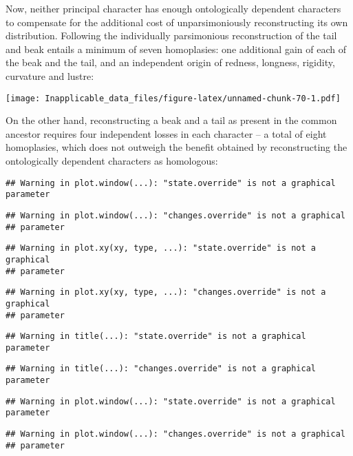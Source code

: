 \documentclass[]{book}
\theoremstyle{definition}
\theoremstyle{definition}
\theoremstyle{definition}
\theoremstyle{remark}
\begin{document}
Now, neither principal character has enough ontologically dependent
characters to compensate for the additional cost of unparsimoniously
reconstructing its own distribution. Following the individually
parsimonious reconstruction of the tail and beak entails a minimum of
seven homoplasies: one additional gain of each of the beak and the tail,
and an independent origin of redness, longness, rigidity, curvature and
lustre:

\texttt{[image: Inapplicable\_data\_files/figure-latex/unnamed-chunk-70-1.pdf]}

On the other hand, reconstructing a beak and a tail as present in the
common ancestor requires four independent losses in each character -- a
total of eight homoplasies, which does not outweigh the benefit obtained
by reconstructing the ontologically dependent characters as homologous:

\begin{verbatim}
## Warning in plot.window(...): "state.override" is not a graphical parameter
\end{verbatim}

\begin{verbatim}
## Warning in plot.window(...): "changes.override" is not a graphical
## parameter
\end{verbatim}

\begin{verbatim}
## Warning in plot.xy(xy, type, ...): "state.override" is not a graphical
## parameter
\end{verbatim}

\begin{verbatim}
## Warning in plot.xy(xy, type, ...): "changes.override" is not a graphical
## parameter
\end{verbatim}

\begin{verbatim}
## Warning in title(...): "state.override" is not a graphical parameter
\end{verbatim}

\begin{verbatim}
## Warning in title(...): "changes.override" is not a graphical parameter
\end{verbatim}

\begin{verbatim}
## Warning in plot.window(...): "state.override" is not a graphical parameter
\end{verbatim}

\begin{verbatim}
## Warning in plot.window(...): "changes.override" is not a graphical
## parameter
\end{verbatim}
\end{document}
